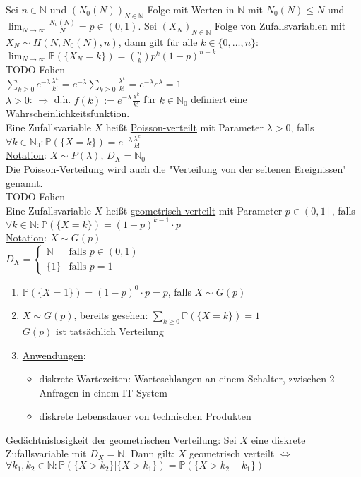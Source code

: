 \documentclass[a4paper]{article}
\newcommand{\ul}{\underline}
\begin{document}
Sei $n\in\mathbb{N}$ und $(N_0(N))_{N\in\mathbb{N}}$ Folge mit Werten in $\mathbb{N}$ mit $N_0(N)\leq N$ und $\lim_{N\rightarrow\infty}\frac{N_0(N)}{N}=p\in(0,1)$. Sei $(X_N)_{N\in\mathbb{N}}$ Folge von Zufallsvariablen mit $X_N\sim H(N,N_0(N),n)$, dann gilt für alle $k\in\{0,\dots,n\}$: $\lim_{N\rightarrow\infty}\mathbb{P}(\{X_N=k\})=\binom{n}{k}p^k(1-p)^{n-k}$\\
TODO Folien\\
$\sum_{k\geq 0}e^{-\lambda}\frac{\lambda^k}{k!}=e^{-\lambda}\sum_{k\geq 0}\frac{\lambda^k}{k!}=e^{-\lambda}e^{\lambda}=1$\\
\ul{$\lambda>0$}: $\Rightarrow$ d.h. $f(k):=e^{-\lambda}\frac{\lambda^k}{k!}$ für $k\in\mathbb{N}_0$ definiert eine Wahrscheinlichkeitsfunktion.\\
Eine Zufallsvariable $X$ heißt \ul{Poisson-verteilt} mit Parameter $\lambda>0$, falls $\forall k\in\mathbb{N}_0:\mathbb{P}(\{X=k\})=e^{-\lambda}\frac{\lambda^k}{k!}$\\
\ul{Notation}: $X\sim P(\lambda)$, $D_X=\mathbb{N}_0$\\
Die Poisson-Verteilung wird auch die "Verteilung von der seltenen Ereignissen" genannt.\\
TODO Folien\\
Eine Zufallsvariable $X$ heißt \ul{geometrisch verteilt} mit Parameter $p\in\left(0,1\right]$, falls $\forall k\in\mathbb{N}:\mathbb{P}(\{X=k\})=(1-p)^{k-1}\cdot p$\\
\ul{Notation}: $X\sim G(p)$\\
$D_X=\begin{cases}
\mathbb{N} & \text{falls }p\in (0,1)\\
\{1\} & \text{falls }p=1
\end{cases}$
\begin{enumerate}[1)]
	\item $\mathbb{P}(\{X=1\})=(1-p)^0\cdot p = p$, falls $X\sim G(p)$
	\item $X\sim G(p)$, bereits gesehen: $\sum_{k\geq0}\mathbb{P}(\{X=k\})=1$\\
	$G(p)$ ist tatsächlich Verteilung
	\item \ul{Anwendungen}:
	\begin{itemize}
		\item diskrete Wartezeiten: Warteschlangen an einem Schalter, zwischen 2 Anfragen in einem IT-System
		\item diskrete Lebensdauer von technischen Produkten
	\end{itemize}
\end{enumerate}
\ul{Gedächtnislosigkeit der geometrischen Verteilung}: Sei $X$ eine diskrete Zufallsvariable mit $D_X=\mathbb{N}$. Dann gilt: $X$ geometrisch verteilt $\Leftrightarrow$ $\forall k_1,k_2\in\mathbb{N}:\mathbb{P}(\{X>k_2\}\vert\{X>k_1\})=\mathbb{P}(\{X>k_2-k_1\})$
\end{document}
